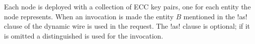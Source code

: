 Each node is deployed with a collection of ECC key pairs, one for each entity the node
represents. When an invocation is made the entity $B$ mentioned in the !as! clause of the
dynamic wire is used in the request. The !as! clause is optional; if it is omitted a
distinguished  is used for the invocation.

\begin{comment}
\subsection{Example}
\label{section-security-example}

Suppose that an existing network deployment !NetA! is imaged with a component !SamplingRateC!
which provides a means to control sampling rates through an interface !SamplingRate!. Further,
since sampling rate modification is a sensitive operation, the network administrators require
!NetA.control! authorization to use this component:

\begin{lstlisting}
module SamplingRateC {
    provides remote interface SamplingRate requires "NetA.control";
}
\end{lstlisting}

\noindent Any node supporting this component will transparently receive \RT\ credentials from
neighboring nodes and attempt to use those credentials to establish that each client entity is a
member of the !NetA.control! role in the formal sense described above.

Suppose also that nodes in !NetA! are deployed with the credential
\begin{displaymath}
\code{NetA.control} \leftarrow \code{WSNAdmin.control}
\end{displaymath}
Here the role !WSNAdmin.control! is administered by some overarching network authority. However
this authority need not be physically ``present'' in the network during operation. Instead the
credential above represents !NetA!'s access control policy: any entity blessed by !WSNAdmin! as
a controller can control !NetA!.

Suppose further that another subnet, called !NetB!, wishes to modify the sampling rate of
!NetA!. A node in !NetB! might be imaged with the following credentials, among possibly others:
\begin{eqnarray}
\code{WSNAdmin.control} & \leftarrow & \code{NetB.control} \\
\code{NetB.control}     & \leftarrow & \code{NetB}
\end{eqnarray}
Note that credential (1) is issued by the !WSNAdmin! authority, while credential (2) is issued
by !NetB!. Critically, direct communication with !NetA! authorities to obtain these credentials
is unnecessary.


\end{comment}
